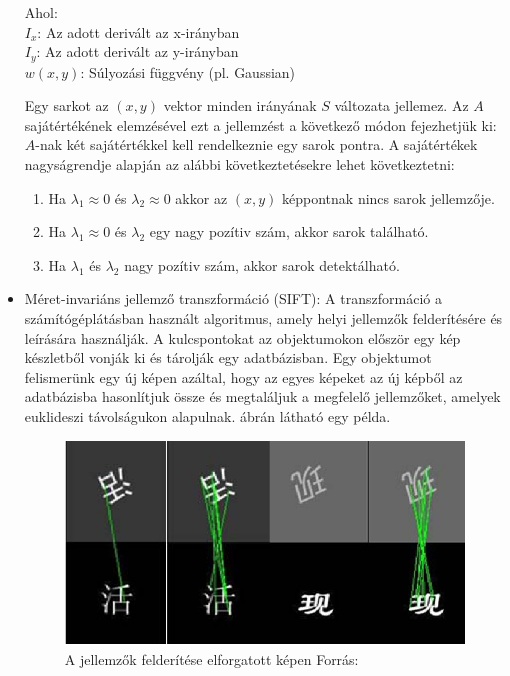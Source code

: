 \begin{itemize}
Ahol:\\
$I_x$: Az adott derivált az x-irányban\\
$I_y$: Az adott derivált az y-irányban\\
$w(x, y)$: Súlyozási függvény (pl. Gaussian)

Egy sarkot az $(x, y)$ vektor minden irányának $S$ változata jellemez. Az $A$ sajátértékének elemzésével ezt a jellemzést a következő módon fejezhetjük ki: $A$-nak két sajátértékkel kell rendelkeznie egy sarok pontra. A sajátértékek nagyságrendje alapján az alábbi következtetésekre lehet következtetni:
\begin{enumerate}
\item Ha $\lambda _{1}\approx 0$ és $\lambda_2 \approx 0$ akkor az $(x,y)$ képpontnak nincs sarok jellemzője.
\item Ha $\lambda_1 \approx 0$ és $\lambda _{2}$ egy nagy pozítiv szám, akkor sarok található.
\item Ha $\lambda_1$ és $\lambda_2$ nagy pozítiv szám, akkor sarok detektálható.
\end{enumerate}
\item Méret-invariáns jellemző transzformáció (SIFT): A transzformáció a számítógéplátásban használt algoritmus, amely helyi jellemzők felderítésére és leírására használják. A kulcspontokat az objektumokon először egy kép készletből vonják ki és tárolják egy adatbázisban. Egy objektumot felismerünk egy új képen azáltal, hogy az egyes képeket az új képből az adatbázisba hasonlítjuk össze és megtaláljuk a megfelelő jellemzőket, amelyek euklideszi távolságukon alapulnak.  ábrán látható egy példa.
\begin{figure}[h]
\centering
\captionsetup{justification=centering}
\includegraphics[scale=0.65]{images/sift1}
\caption{A jellemzők felderítése elforgatott képen \hspace{\textwidth}Forrás:\cite{Jin2009SSIFTAI}}
\label{fig:sift}
\end{figure}
\end{itemize}

